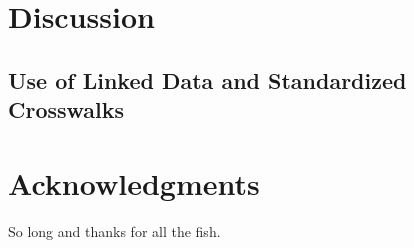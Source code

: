 \documentclass[fleqn,10pt,lineno]{wlpeerj} %
\begin{document}
\subsection*{}

\subsubsection*{}

\subsubsection*{}

\section*{Discussion}

\lipsum[10] %

\subsection*{Use of Linked Data and Standardized Crosswalks}

\lipsum[11] %

\section*{Acknowledgments}

So long and thanks for all the fish.


\end{document}
